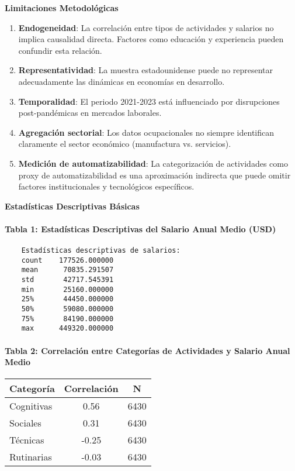 \documentclass{article}
\theoremstyle{remark}
\theoremstyle{definition}
\begin{document}
\begin{tcolorbox}
\textbf{Limitaciones Metodológicas}

\begin{enumerate}
\item \textbf{Endogeneidad}: La correlación entre tipos de actividades y salarios no implica causalidad directa. Factores como educación y experiencia pueden confundir esta relación.

\item \textbf{Representatividad}: La muestra estadounidense puede no representar adecuadamente las dinámicas en economías en desarrollo.

\item \textbf{Temporalidad}: El periodo 2021-2023 está influenciado por disrupciones post-pandémicas en mercados laborales.

\item \textbf{Agregación sectorial}: Los datos ocupacionales no siempre identifican claramente el sector económico (manufactura vs. servicios).

\item \textbf{Medición de automatizabilidad}: La categorización de actividades como proxy de automatizabilidad es una aproximación indirecta que puede omitir factores institucionales y tecnológicos específicos.
\end{enumerate}

\textbf{Estadísticas Descriptivas Básicas}

\paragraph{Tabla 1: Estadísticas Descriptivas del Salario Anual Medio (USD)}

    \begin{verbatim}
    Estadísticas descriptivas de salarios:
    count    177526.000000
    mean      70835.291507
    std       42717.545391
    min       25160.000000
    25%       44450.000000
    50%       59080.000000
    75%       84190.000000
    max      449320.000000
    \end{verbatim}


\paragraph{Tabla 2: Correlación entre Categorías de Actividades y Salario Anual Medio}
\begin{table}[H]
\centering
\begin{tabular}{|l|c|c|}
\hline
\textbf{Categoría} & \textbf{Correlación} & \textbf{N} \\
\hline
Cognitivas & 0.56 & 6430 \\
Sociales & 0.31 & 6430 \\
Técnicas & -0.25 & 6430 \\
Rutinarias & -0.03 & 6430 \\
\hline
\end{tabular}
\end{table}


\end{tcolorbox}
\end{document}
